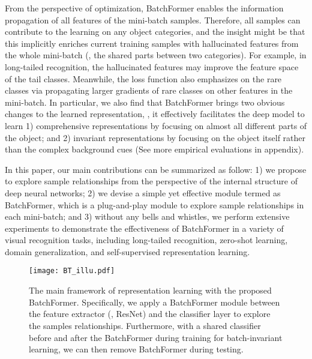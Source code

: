 \documentclass[10pt,twocolumn,letterpaper]{article}
\begin{document}
From the perspective of optimization, BatchFormer enables the information propagation of all features of the mini-batch samples. Therefore, all samples can contribute to the learning on any object categories, and the insight might be that this implicitly enriches current training samples with hallucinated features from the whole mini-batch (\eg, the shared parts between two categories). For example, in long-tailed recognition, the hallucinated features may improve the feature space of the tail classes. Meanwhile, the loss function also emphasizes on the rare classes via propagating larger gradients of rare classes on other features in the mini-batch. In particular, we also find that BatchFormer brings two obvious changes to the learned representation, \ie, it effectively facilitates the deep model to learn 1) comprehensive representations by focusing on almost all different parts of the object; and 2) invariant representations by focusing on the object itself rather than the complex background cues (See more empirical evaluations in appendix).













In this paper, our main contributions can be summarized as follow: 1) we propose to explore sample relationships from the perspective of the internal structure of deep neural networks; 2) we devise a simple yet effective module termed as BatchFormer, which is a plug-and-play module to explore sample relationships in each mini-batch; and 3) without any bells and whistles, we perform extensive experiments to demonstrate the effectiveness of BatchFormer in a variety of visual recognition tasks, including long-tailed recognition, zero-shot learning, domain generalization, and self-supervised representation learning.


\begin{figure*}[!ht]
    \centering
    \texttt{[image: BT\_illu.pdf]}
    \caption{The main framework of representation learning with the proposed BatchFormer. Specifically, we apply a BatchFormer module between the feature extractor (\eg, ResNet) and the classifier layer to explore the samples relationships. Furthermore, with a shared classifier before and after the BatchFormer during training for batch-invariant learning, we can then remove BatchFormer during testing.}
    \label{fig:struct}
\end{figure*}
\end{document}
